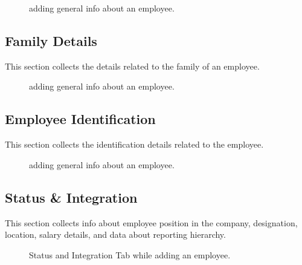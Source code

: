 \documentclass[letterpaper,10pt,english]{sphinxmanual}
\begin{document}
\begin{figure}[htbp]
\centering
\capstart

\noindent{}
\caption{adding general info about an employee.}\label{\detokenize{employee/add:id5}}\end{figure}


\subsection{Family Details}
\label{\detokenize{employee/add:family-details}}
This section collects the details related to the family of an employee.

\begin{figure}[htbp]
\centering
\capstart

\noindent{}
\caption{adding general info about an employee.}\label{\detokenize{employee/add:id6}}\end{figure}


\subsection{Employee Identification}
\label{\detokenize{employee/add:employee-identification}}
This section collects the identification details related to the employee.

\begin{figure}[htbp]
\centering
\capstart

\noindent{}
\caption{adding general info about an employee.}\label{\detokenize{employee/add:id7}}\end{figure}


\subsection{Status \& Integration}
\label{\detokenize{employee/add:status-integration}}
This section collects info about employee position in the company, designation, location, salary details, and data about reporting hierarchy.

\begin{figure}[htbp]
\centering
\capstart

\noindent{}
\caption{Status and Integration Tab while adding an employee.}\label{\detokenize{employee/add:id8}}\end{figure}
\end{document}
